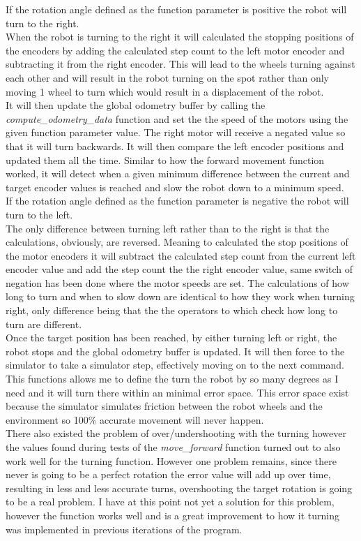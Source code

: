 \documentclass[10pt,a4paper]{article}
\begin{document}
\begin{flushleft}
If the rotation angle defined as the function parameter is positive the robot will turn to the right.\\
When the robot is turning to the right it will calculated the stopping positions of the encoders by adding the calculated step count to the left motor encoder and subtracting it from the right encoder. This will lead to the wheels turning against each other and will result in the robot turning on the spot rather than only moving 1 wheel to turn which would result in a displacement of the robot. \\
It will then update the global odometry buffer by calling the \textit{compute\_odometry\_data} function and set the the speed of the motors using the given function parameter value. The right motor will receive a negated value so that it will turn backwards. 
It will then compare the left encoder positions and updated them all the time. Similar to how the forward movement function worked, it will detect when a given minimum difference between the current and target encoder values is reached and slow the robot down to a minimum speed. \\[3ex]

If the rotation angle defined as the function parameter is negative the robot will turn to the left.\\
The only difference between turning left rather than to the right is that the calculations, obviously, are reversed. Meaning to calculated the stop positions of the motor encoders it will subtract the calculated step count from the current left encoder value and add the step count the the right
encoder value, same switch of negation has been done where the motor speeds are set.
The calculations of how long to turn and when to slow down are identical to how they work when turning right, only difference being that the the operators to which check how long to turn are different.\\
Once the target position has been reached, by either turning left or right, the robot stops and the global odometry buffer is updated. 
It will then force to the simulator to take a simulator step, effectively moving on to the next command.\\[3ex]

This functions allows me to define the turn the robot by so many degrees as I need and it will turn there within an minimal error space. This error space exist because the simulator simulates friction between the robot wheels and the environment so 100\% accurate movement will never happen.\\
There also existed the problem of over/undershooting with the turning however the values found during tests of the \textit{move\_forward} function turned out to also work well for the turning function. However one problem remains, since there never is going to be a perfect rotation the error value will add up over time, resulting in less and less accurate turns, overshooting the target rotation is going to be a real problem. I have at this point not yet a solution for this problem, however the function works well and is a great improvement to how it turning was implemented in previous iterations of the program.


\end{flushleft}
\end{document}
